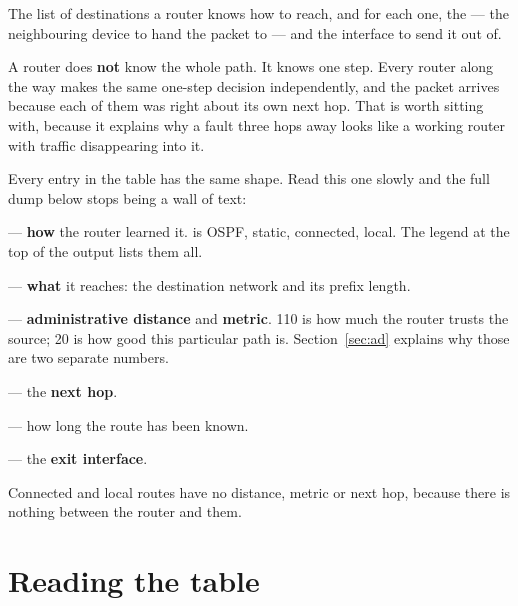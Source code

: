 \begin{definitionbox}
The list of destinations a router knows how to reach, and for each one, the
 --- the neighbouring device to hand the packet to --- and the
interface to send it out of.

A router does \textbf{not} know the whole path. It knows one step. Every router
along the way makes the same one-step decision independently, and the packet
arrives because each of them was right about its own next hop. That is worth
sitting with, because it explains why a fault three hops away looks like a
working router with traffic disappearing into it.
\end{definitionbox}

\begin{conceptbox}
Every entry in the table has the same shape. Read this one slowly and the full
dump below stops being a wall of text:

\begin{center}
\end{center}

\begin{tight}
  \item {} --- \textbf{how} the router learned it.  is OSPF, 
        static,  connected,  local. The legend at the top of the
        output lists them all.
  \item {} --- \textbf{what} it reaches: the destination network
        and its prefix length.
  \item \cmd{[110/20]} --- \textbf{administrative distance} and \textbf{metric}.
        110 is how much the router trusts the source; 20 is how good this
        particular path is. Section~\ref{sec:ad} explains why those are two
        separate numbers.
  \item {} --- the \textbf{next hop}.
  \item {} --- how long the route has been known.
  \item {} --- the \textbf{exit interface}.
\end{tight}

Connected and local routes have no distance, metric or next hop, because there is
nothing between the router and them.
\end{conceptbox}

\section{Reading the table}

